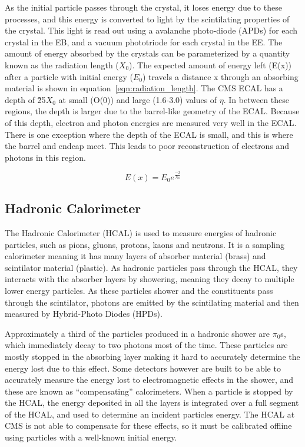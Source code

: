 As the initial particle passes through the crystal, it loses energy due to these processes, and this energy is converted to light by the scintilating properties of the crystal.
This light is read out using a avalanche photo-diode (APDs) for each crystal in the EB, and a vacuum phototriode for each crystal in the EE.
The amount of energy absorbed by the crystals can be parameterized by a quantity known as the radiation length ($X_{0}$).
The expected amount of energy left (E(x)) after a particle with initial energy ($E_{0}$)
travels a distance x through an absorbing material is shown in equation~\ref{eqn:radiation_length}.
The CMS ECAL has a depth of \~25$X_{0}$ at small (O(0)) and large (1.6-3.0) values of $\eta$.
In between these regions, the depth is larger due to the barrel-like geometry of the ECAL.
Because of this depth, electron and photon energies are measured very well in the ECAL.
There is one exception where the depth of the ECAL is small, and this is where the barrel and endcap meet.
This leads to poor reconstruction of electrons and photons in this region.

\begin{equation}
  \label{eqn:radiation_length}
  E(x) = E_{0}e^{\frac{-x}{X_{0}}}  
\end{equation}

\subsection{Hadronic Calorimeter}
\label {subs:HCAL}
The Hadronic Calorimeter (HCAL) is used to measure energies of hadronic particles, such as pions, gluons, protons, kaons and neutrons.
It is a sampling calorimeter meaning it has many layers of absorber material (brass) and scintilator material (plastic).
As hadronic particles pass through the HCAL, they interacts with the absorber layers by showering, meaning they decay to multiple lower energy particles.
As these particles shower and the constituents pass through the scintilator, photons are emitted by the scintilating material and then measured by Hybrid-Photo Diodes (HPDs).

Approximately a third of the particles produced in a hadronic shower are $\pi_{0}$s, which immediately decay to two photons most of the time.
These particles are mostly stopped in the absorbing layer making it hard to accurately determine the energy lost due to this effect.
Some detectors however are built to be able to accurately measure the energy lost to electromagnetic effects in the shower, and these are known as ``compensating'' calorimeters.
When a particle is stopped by the HCAL, the energy deposited in all the layers is integrated over a full segment of the HCAL, and used to determine an incident particles energy.
The HCAL at CMS is not able to compensate for these effects, so it must be calibrated offline using particles with a well-known initial energy.

